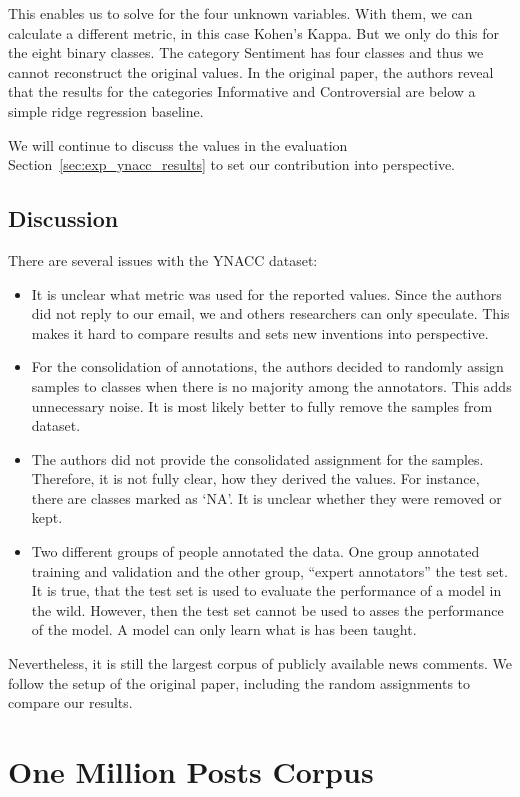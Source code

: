 This enables us to solve for the four unknown variables. With them, we can calculate a different metric, in this case Kohen's Kappa. But we only do this for the eight binary classes.
The category Sentiment has four classes and thus we cannot reconstruct the original values.
In the original paper, the authors reveal that the results for the categories Informative and Controversial are below a simple ridge regression baseline.

We will continue to discuss the values in the evaluation Section~\ref{sec:exp_ynacc_results} to set our contribution into perspective.

\subsection{Discussion}

There are several issues with the YNACC dataset:
\begin{itemize}
	\item It is unclear what metric was used for the reported values. Since the authors did not reply to our email, we and others researchers can only speculate. This makes it hard to compare results and sets new inventions into perspective.
    \item For the consolidation of annotations, the authors decided to randomly assign samples to classes when there is no majority among the annotators. This adds unnecessary noise. It is most likely better to fully remove the samples from dataset.
    \item The authors did not provide the consolidated assignment for the samples. Therefore, it is not fully clear, how they derived the values. For instance, there are classes marked as `NA'. It is unclear whether they were removed or kept.
    \item Two different groups of people annotated the data. One group annotated training and validation and the other group, ``expert annotators'' the test set. It is true, that the test set is used to evaluate the performance of a model in the wild. However, then the test set cannot be used to asses the performance of the model. A model can only learn what is has been taught.
\end{itemize}

Nevertheless, it is still the largest corpus of publicly available news comments. We follow the setup of the original paper, including the random assignments to compare our results.

\section{One Million Posts Corpus}
\label{sec:ompc_ds}


